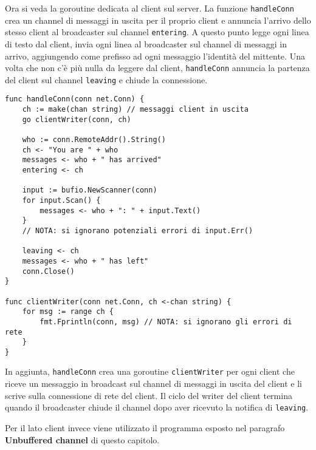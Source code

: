 \documentclass[../../thesis.tex]{subfiles}
\begin{document}
    Ora si veda la goroutine dedicata al client sul server.
    La funzione \verb"handleConn" crea un channel di messaggi in uscita per il proprio client e annuncia l'arrivo dello stesso client al broadcaster sul channel \verb"entering".
    A questo punto legge ogni linea di testo dal client, invia ogni linea al broadcaster sul channel di messaggi in arrivo, aggiungendo come prefisso ad ogni messaggio l'identità del mittente.
    Una volta che non c'è più nulla da leggere dal client, \verb"handleConn" annuncia la partenza del client sul channel \verb"leaving" e chiude la connessione.
    \begin{lstlisting}[frame = single,label={lst:lstlisting7-10.3}]
func handleConn(conn net.Conn) {
    ch := make(chan string) // messaggi client in uscita
    go clientWriter(conn, ch)

    who := conn.RemoteAddr().String()
    ch <- "You are " + who
    messages <- who + " has arrived"
    entering <- ch

    input := bufio.NewScanner(conn)
    for input.Scan() {
        messages <- who + ": " + input.Text()
    }
    // NOTA: si ignorano potenziali errori di input.Err()

    leaving <- ch
    messages <- who + " has left"
    conn.Close()
}

func clientWriter(conn net.Conn, ch <-chan string) {
    for msg := range ch {
        fmt.Fprintln(conn, msg) // NOTA: si ignorano gli errori di rete
    }
}
    \end{lstlisting}
    In aggiunta, \verb"handleConn" crea una goroutine \verb"clientWriter" per ogni client che riceve un messaggio in broadcast sul channel di messaggi in uscita del client e li scrive sulla connessione di rete del client.
    Il ciclo del writer del client termina quando il broadcaster chiude il channel dopo aver ricevuto la notifica di \verb"leaving".
    \hfill \vspace{12pt}

    Per il lato client invece viene utilizzato il programma esposto nel paragrafo \textbf{Unbuffered channel} di questo capitolo.
    \hfill \vspace{12pt}
\end{document}
